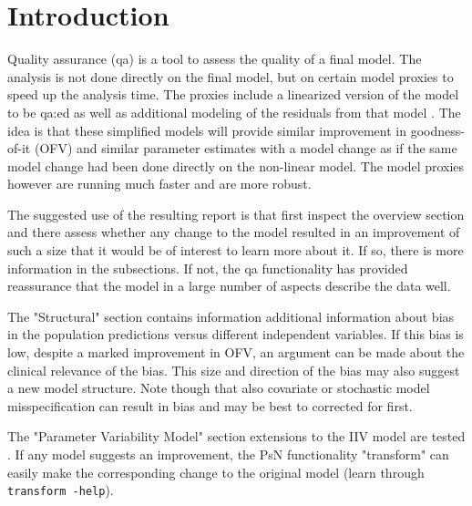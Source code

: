 

\usepackage{hyperref}


\maketitle
\newcommand{\guidetoolname}{qa}
\tableofcontents
\newpage


\section{Introduction}
Quality assurance (qa) is a tool to assess the quality of a final model. The analysis is not done directly on the final model, but on certain model proxies to speed up the analysis time.
The proxies include a linearized version of the model to be qa:ed as well as additional modeling of the residuals from that model \cite{Khandelwal, Svensson, Ibrahim}. The idea is that these simplified models will provide similar improvement in goodness-of-it (OFV) and similar parameter estimates with a model change as if the same model change had been done directly on the non-linear model. The model proxies however are running much faster and are more robust. 

The suggested use of the resulting report is that first inspect the overview section and there assess whether any change to the model resulted in an improvement of such a size that it would be of interest to learn more about it. If so, there is more information in the subsections. If not, the qa functionality has provided reassurance that the model in a large number of aspects describe the data well. 

The "Structural" section contains information additional information about bias in the population predictions versus different independent variables.  If this bias is low, despite a marked improvement in OFV, an argument can be made about the clinical relevance of the bias. This size and direction of the bias may also suggest a new model structure. Note though that also covariate or stochastic model misspecification can result in bias and may be best to corrected for first. 

The "Parameter Variability Model" section extensions to the IIV model are tested \cite{Svensson, Petersson}. If any model suggests an improvement, the PsN functionality "transform" can easily make the corresponding change to the original model (learn through \verb|transform -help|).


